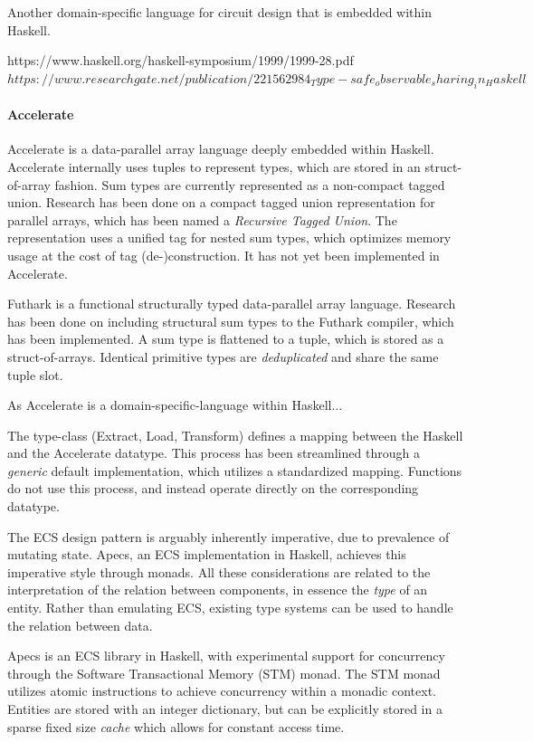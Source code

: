 \documentclass{article}
\newcommand{\type}[1]{\smash{\colorbox{codegray}{\texttt{#1}}}}
\begin{document}
Another domain-specific language for circuit design that is embedded within Haskell.

https://www.haskell.org/haskell-symposium/1999/1999-28.pdf
$https://www.researchgate.net/publication/221562984_Type-safe_observable_sharing_in_Haskell$


\paragraph{Accelerate}

Accelerate is a data-parallel array language deeply embedded within Haskell.
Accelerate internally uses tuples to represent types, which are stored in an struct-of-array fashion.
Sum types are currently represented as a non-compact tagged union.
Research has been done on a compact tagged union representation for parallel arrays, which has been named a {\it Recursive Tagged Union}\cite{accelerate-sum-types}.
The representation uses a unified tag for nested sum types, which optimizes memory usage at the cost of tag (de-)construction.  
It has not yet been implemented in Accelerate.

Futhark is a functional structurally typed data-parallel array language.
Research has been done on including structural sum types to the Futhark compiler\cite{futhark-sum-types}, which has been implemented.
A sum type is flattened to a tuple, which is stored as a struct-of-arrays. 
Identical primitive types are {\it deduplicated} and share the same tuple slot.


As Accelerate is a domain-specific-language within Haskell...

The \type{Elt} type-class (Extract, Load, Transform) defines a mapping between the Haskell and the Accelerate datatype.
This process has been streamlined through a {\it generic} default implementation, which utilizes a standardized mapping.
Functions do not use this process, and instead operate directly on the corresponding datatype.

The ECS design pattern is arguably inherently imperative, due to prevalence of mutating state. 
Apecs, an ECS implementation in Haskell, achieves this imperative style through monads\cite{ecs-apecs}.
All these considerations are related to the interpretation of the relation between components, in essence the {\it type} of an entity. 
Rather than emulating ECS, existing type systems can be used to handle the relation between data.

Apecs\cite{ecs-apecs} is an ECS library in Haskell, with experimental support for concurrency through the Software Transactional Memory (STM) monad\cite{STM-monad}.
The STM monad utilizes atomic instructions to achieve concurrency within a monadic context.
Entities are stored with an integer dictionary, but can be explicitly stored in a sparse fixed size {\it cache} which allows for constant access time. 
\end{document}
